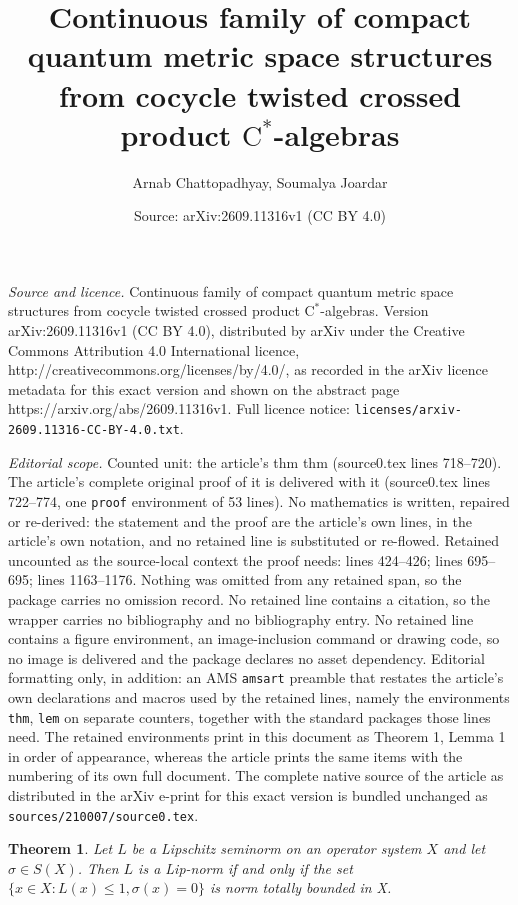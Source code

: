 \documentclass[10pt,a4paper]{amsart}
\title{Continuous family of compact quantum metric space structures from cocycle twisted crossed product $\textrm{C}^{\ast}$-algebras}
\author{Arnab Chattopadhyay, Soumalya Joardar}
\date{Source: arXiv:2609.11316v1 (CC BY 4.0)}
\newtheorem{thm}{Theorem}
\begin{document}
\maketitle

\noindent\emph{Source and licence.} Continuous family of compact quantum metric space structures from cocycle twisted crossed product $\textrm{C}^{\ast}$-algebras. Version arXiv:2609.11316v1 (CC BY 4.0), distributed by arXiv under the Creative Commons Attribution 4.0 International licence, http://creativecommons.org/licenses/by/4.0/, as recorded in the arXiv licence metadata for this exact version and shown on the abstract page https://arxiv.org/abs/2609.11316v1. Full licence notice: \texttt{licenses/arxiv-2609.11316-CC-BY-4.0.txt}.\par\smallskip

\noindent\textit{Editorial scope.} Counted unit: the article's thm thm (source0.tex lines 718--720). The article's complete original proof of it is delivered with it (source0.tex lines 722--774, one \texttt{proof} environment of 53 lines). No mathematics is written, repaired or re-derived: the statement and the proof are the article's own lines, in the article's own notation, and no retained line is substituted or re-flowed.  Retained uncounted as the source-local context the proof needs: lines 424--426; lines 695--695; lines 1163--1176.  Nothing was omitted from any retained span, so the package carries no omission record.  No retained line contains a citation, so the wrapper carries no bibliography and no bibliography entry.  No retained line contains a figure environment, an image-inclusion command or drawing code, so no image is delivered and the package declares no asset dependency.  Editorial formatting only, in addition: an AMS \texttt{amsart} preamble that restates the article's own declarations and macros used by the retained lines, namely the environments \texttt{thm}, \texttt{lem} on separate counters, together with the standard packages those lines need.  The retained environments print in this document as Theorem 1, Lemma 1 in order of appearance, whereas the article prints the same items with the numbering of its own full document.  The complete native source of the article as distributed in the arXiv e-print for this exact version is bundled unchanged as \texttt{sources/210007/source0.tex}.
\begin{thm}\label{totbouiff}
    Let $L$ be a Lipschitz seminorm on an operator system $X$ and let $\sigma\in S(X)$. Then $L$ is a Lip-norm if and only if the set $\{x\in X: L(x)\leq 1, \sigma(x)=0\}$ is norm totally bounded in X. 
\end{thm}
\end{document}
